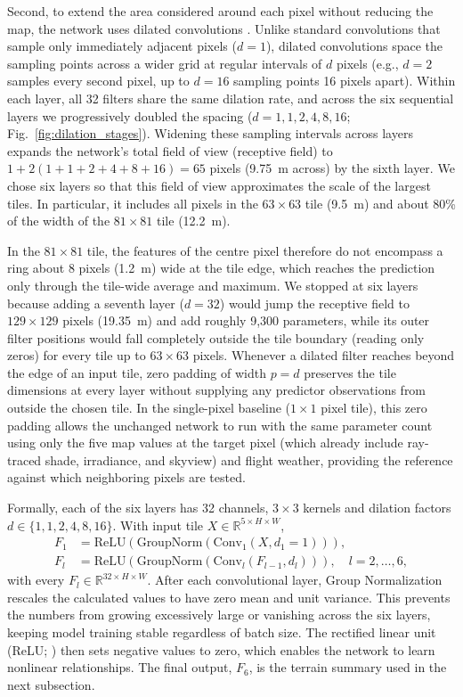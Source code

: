 \documentclass[12pt]{article}
\begin{document}
Second, to extend the area considered around each pixel without reducing the map, the network uses dilated convolutions \citep{yu_2016}. Unlike standard convolutions that sample only immediately adjacent pixels ($d = 1$), dilated convolutions space the sampling points across a wider grid at regular intervals of $d$ pixels (e.g., $d = 2$ samples every second pixel, up to $d = 16$ sampling points 16 pixels apart). Within each layer, all 32 filters share the same dilation rate, and across the six sequential layers we progressively doubled the spacing ($d = 1, 1, 2, 4, 8, 16$; Fig.~\ref{fig:dilation_stages}). Widening these sampling intervals across layers expands the network's total field of view (receptive field) to $1 + 2(1+1+2+4+8+16) = 65$ pixels (9.75~m across) by the sixth layer. We chose six layers so that this field of view approximates the scale of the largest tiles. In particular, it includes all pixels in the $63\times63$ tile (9.5~m) and about 80\% of the width of the $81\times81$ tile (12.2~m).

In the $81\times81$ tile, the features of the centre pixel therefore do not encompass a ring about 8 pixels (1.2~m) wide at the tile edge, which reaches the prediction only through the tile-wide average and maximum. We stopped at six layers because adding a seventh layer ($d = 32$) would jump the receptive field to $129\times129$ pixels (19.35~m) and add roughly 9,300 parameters, while its outer filter positions would fall completely outside the tile boundary (reading only zeros) for every tile up to $63\times63$ pixels. Whenever a dilated filter reaches beyond the edge of an input tile, zero padding of width $p = d$ preserves the tile dimensions at every layer without supplying any predictor observations from outside the chosen tile. In the single-pixel baseline ($1\times1$ pixel tile), this zero padding allows the unchanged network to run with the same parameter count using only the five map values at the target pixel (which already include ray-traced shade, irradiance, and skyview) and flight weather, providing the reference against which neighboring pixels are tested.

\noindent Formally, each of the six layers has 32 channels, $3\times3$ kernels and dilation factors $d \in \{1, 1, 2, 4, 8, 16\}$. With input tile $X \in \mathbb{R}^{5 \times H \times W}$,
\begin{align}
F_1 &= \text{ReLU}\left(\text{GroupNorm}\left(\text{Conv}_1(X, d_1=1)\right)\right), \\
F_l &= \text{ReLU}\left(\text{GroupNorm}\left(\text{Conv}_l(F_{l-1}, d_l)\right)\right), \quad l = 2,\dots,6,
\end{align}
with every $F_l \in \mathbb{R}^{32 \times H \times W}$. After each convolutional layer, Group Normalization \citep{wu_2018} rescales the calculated values to have zero mean and unit variance. This prevents the numbers from growing excessively large or vanishing across the six layers, keeping model training stable regardless of batch size. The rectified linear unit (ReLU; \citealt{nair_2010}) then sets negative values to zero, which enables the network to learn nonlinear relationships. The final output, $F_6$, is the terrain summary used in the next subsection.
\end{document}
